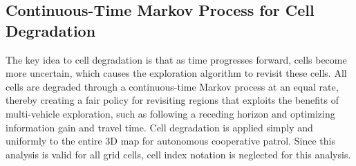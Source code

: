 \documentclass[smallextended]{svjour3}       %
\begin{document}
\subsection{Continuous-Time Markov Process for Cell Degradation}

The key idea to cell degradation is that as time progresses forward, cells become more uncertain, which causes the exploration algorithm to revisit these cells. All cells are degraded through a continuous-time Markov process at an equal rate, thereby creating a fair policy for revisiting regions that exploits the benefits of multi-vehicle exploration, such as following a receding horizon and optimizing information gain and travel time. Cell degradation is applied simply and uniformly to the entire 3D map for autonomous cooperative patrol. Since this analysis is valid for all grid cells, cell index notation is neglected for this analysis.
\end{document}
